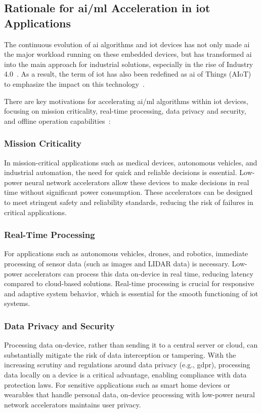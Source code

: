 \subsection{Rationale for \gls{ai}/\gls{ml} Acceleration in \gls{iot} Applications}
The continuous evolution of \gls{ai} algorithms and \gls{iot} devices has not only made \gls{ai} the major workload running on these embedded devices, but has transformed \gls{ai} into the main approach for industrial solutions, especially in the rise of Industry 4.0~\cite{alcacer2019scanning}. As a result, the term of \gls{iot} has also been redefined as \gls{ai} of Things (AIoT) to emphasize the impact on this technology~\cite{zhang2020empowering}.

There are key motivations for accelerating \gls{ai}/\gls{ml} algorithms within \gls{iot} devices, focusing on mission criticality, real-time processing, data privacy and security, and offline operation capabilities~\cite{loh20201}:

\subsubsection{Mission Criticality}
In mission-critical applications such as medical devices, autonomous vehicles, and industrial automation, the need for quick and reliable decisions is essential. Low-power neural network accelerators allow these devices to make decisions in real time without significant power consumption. These accelerators can be designed to meet stringent safety and reliability standards, reducing the risk of failures in critical applications.

\subsubsection{Real-Time Processing}
For applications such as autonomous vehicles, drones, and robotics, immediate processing of sensor data (such as images and LIDAR data) is necessary. Low-power accelerators can process this data on-device in real time, reducing latency compared to cloud-based solutions. Real-time processing is crucial for responsive and adaptive system behavior, which is essential for the smooth functioning of \gls{iot} systems.

\subsubsection{Data Privacy and Security}
Processing data on-device, rather than sending it to a central server or cloud, can substantially mitigate the risk of data interception or tampering. With the increasing scrutiny and regulations around data privacy (e.g., \gls{gdpr}), processing data locally on a device is a critical advantage, enabling compliance with data protection laws. For sensitive applications such as smart home devices or wearables that handle personal data, on-device processing with low-power neural network accelerators maintains user privacy.


